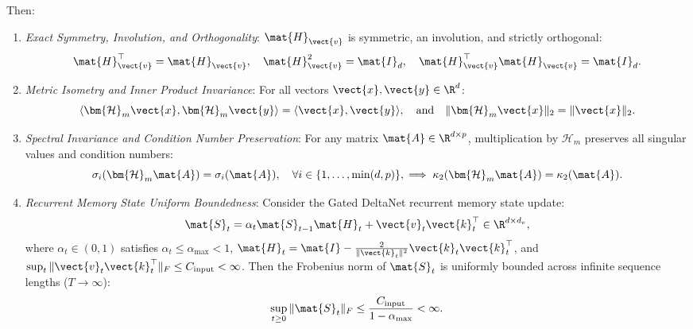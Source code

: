 \begin{theorem}
Then:
\begin{enumerate}
    \item \emph{Exact Symmetry, Involution, and Orthogonality}:
    $\mat{H}_{\vect{v}}$ is symmetric, an involution, and strictly orthogonal:
    \begin{equation}
    \mat{H}_{\vect{v}}^\top = \mat{H}_{\vect{v}}, \quad \mat{H}_{\vect{v}}^2 = \mat{I}_d, \quad \mat{H}_{\vect{v}}^\top \mat{H}_{\vect{v}} = \mat{I}_d.
    \label{eq:householder_involution}
    \end{equation}
    \item \emph{Metric Isometry and Inner Product Invariance}:
    For all vectors $\vect{x}, \vect{y} \in \R^d$:
    \begin{equation}
    \langle \bm{\mathcal{H}}_m \vect{x}, \bm{\mathcal{H}}_m \vect{y} \rangle = \langle \vect{x}, \vect{y} \rangle, \quad \text{and} \quad \|\bm{\mathcal{H}}_m \vect{x}\|_2 = \|\vect{x}\|_2.
    \label{eq:householder_metric_isometry}
    \end{equation}
    \item \emph{Spectral Invariance and Condition Number Preservation}:
    For any matrix $\mat{A} \in \R^{d \times p}$, multiplication by $\bm{\mathcal{H}}_m$ preserves all singular values and condition numbers:
    \begin{equation}
    \sigma_i(\bm{\mathcal{H}}_m \mat{A}) = \sigma_i(\mat{A}), \quad \forall i \in \{1, \dots, \min(d, p)\}, \implies \kappa_2(\bm{\mathcal{H}}_m \mat{A}) = \kappa_2(\mat{A}).
    \label{eq:householder_spectral_invariance}
    \end{equation}
    \item \emph{Recurrent Memory State Uniform Boundedness}:
    Consider the Gated DeltaNet recurrent memory state update:
    \begin{equation}
    \mat{S}_t = \alpha_t \mat{S}_{t-1} \mat{H}_t + \vect{v}_t \vect{k}_t^\top \in \R^{d \times d_v},
    \label{eq:gated_deltanet_update}
    \end{equation}
    where $\alpha_t \in (0, 1)$ satisfies $\alpha_t \le \alpha_{\max} < 1$, $\mat{H}_t = \mat{I} - \frac{2}{\|\vect{k}_t\|^2} \vect{k}_t \vect{k}_t^\top$, and $\sup_t \|\vect{v}_t \vect{k}_t^\top\|_F \le C_{\text{input}} < \infty$.
    Then the Frobenius norm of $\mat{S}_t$ is uniformly bounded across infinite sequence lengths ($T \to \infty$):
    \begin{equation}
    \sup_{t \ge 0} \|\mat{S}_t\|_F \le \frac{C_{\text{input}}}{1 - \alpha_{\max}} < \infty.
    \label{eq:deltanet_uniform_bound}
    \end{equation}
\end{enumerate}
\end{theorem}

